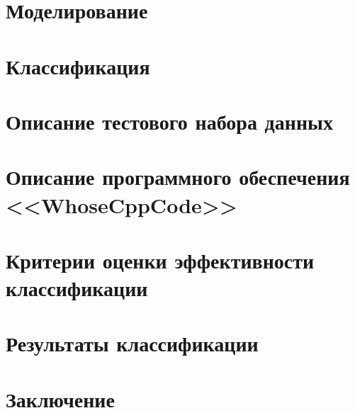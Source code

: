 \newpage  
\section{Моделирование}\label{modeling}

 
 
\newpage  
\section{Классификация}\label{classifiers}



\newpage 
\section{Описание тестового набора данных}\label{test_data}


\newpage
\section{Описание программного обеспечения <<WhoseCppCode>>}


\clearpage
\section{Критерии оценки эффективности классификации}\label{eval}

 
\newpage
\section{Результаты классификации}


% 
% 
% 
% 
% 
 
\newpage
\section*{Заключение}

 
